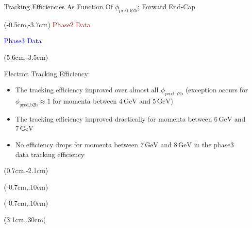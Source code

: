 \documentclass[8pt]{beamer}
\begin{document}
\begin{frame}{Tracking Efficiencies As Function Of $\phi_{\textrm{pred,b2b}}$; Forward End-Cap}
	\begin{textblock*}{4cm}(-0.5cm,-3.7cm)
		\textcolor{brown}{Phase2 Data}
		
		\textcolor{blue}{Phase3 Data}
	\end{textblock*}
	
	
	\begin{textblock*}{6cm}(5.6cm,-3.5cm)
		\begin{mybox}
			Electron Tracking Efficiency:
			\begin{itemize}
				\item The tracking efficiency improved over almost all $\phi_{\textrm{pred,b2b}}$ (exception occurs for $\phi_{\textrm{pred,b2b}} \approx 1$ for momenta between $4\,\textrm{GeV}$ and $5\,\textrm{GeV}$)
				
				\item<3-> The tracking efficiency improved drastically for momenta between $6\,\textrm{GeV}$ and $7\,\textrm{GeV}$
				\item<4-> No efficiency drops for momenta between $7\,\textrm{GeV}$ and $8\,\textrm{GeV}$ in the phase3 data tracking efficiency
			\end{itemize}
		\end{mybox}
	\end{textblock*}
	
		
	\begin{textblock*}{5cm}(0.7cm,-2.1cm)
	\end{textblock*}	
	
	
	
	
		\begin{textblock*}{5cm}(-0.7cm,.10cm)
	\end{textblock*}
	
	
\begin{textblock*}{5cm}(-0.7cm,.10cm)
\end{textblock*}	
	
	
		
	\begin{textblock*}{5cm}(3.1cm,.30cm)
	\end{textblock*}
	
	
	
	

	\pause[5]
	
\end{frame}
\end{document}
